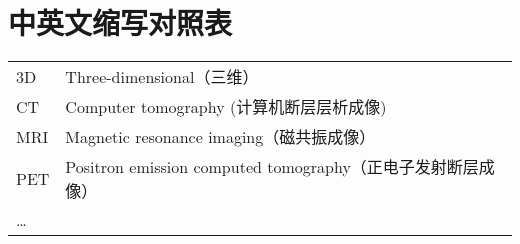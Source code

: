 \chapter{中英文缩写对照表}
\begin{center} \xiaosi
\renewcommand{\arraystretch}{1.5}
\begin{tabular}{p{2.3cm}p{12.7cm}}
    3D&Three-dimensional（三维）\\
    CT&Computer tomography (计算机断层层析成像)\\
    MRI&Magnetic resonance imaging（磁共振成像）\\
    PET&Positron emission computed tomography（正电子发射断层成像）\\
    …&
\end{tabular}
\end{center}  